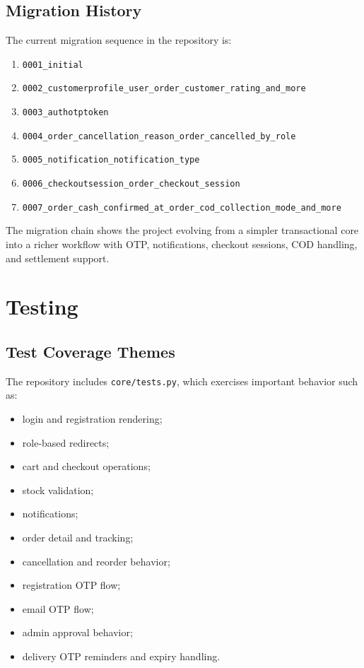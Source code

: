 \documentclass[12pt,a4paper]{article}
\begin{document}
\subsection{Migration History}
The current migration sequence in the repository is:
\begin{enumerate}[leftmargin=1.5em]
    \item \texttt{0001\_initial}
    \item \texttt{0002\_customerprofile\_user\_order\_customer\_rating\_and\_more}
    \item \texttt{0003\_authotptoken}
    \item \texttt{0004\_order\_cancellation\_reason\_order\_cancelled\_by\_role}
    \item \texttt{0005\_notification\_notification\_type}
    \item \texttt{0006\_checkoutsession\_order\_checkout\_session}
    \item \texttt{0007\_order\_cash\_confirmed\_at\_order\_cod\_collection\_mode\_and\_more}
\end{enumerate}

The migration chain shows the project evolving from a simpler transactional core into a richer workflow with OTP, notifications, checkout sessions, COD handling, and settlement support.

\section{Testing}
\subsection{Test Coverage Themes}
The repository includes \texttt{core/tests.py}, which exercises important behavior such as:
\begin{itemize}[leftmargin=1.5em]
    \item login and registration rendering;
    \item role-based redirects;
    \item cart and checkout operations;
    \item stock validation;
    \item notifications;
    \item order detail and tracking;
    \item cancellation and reorder behavior;
    \item registration OTP flow;
    \item email OTP flow;
    \item admin approval behavior;
    \item delivery OTP reminders and expiry handling.
\end{itemize}
\end{document}
